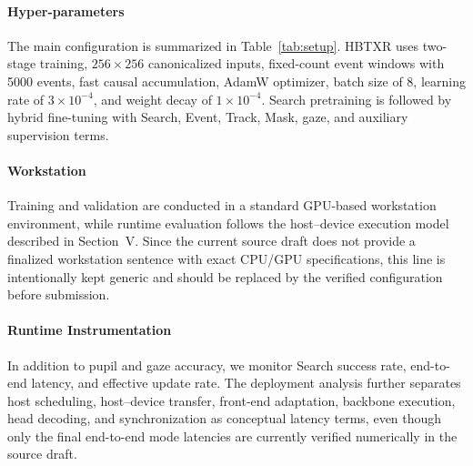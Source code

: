 \documentclass[journal]{IEEEtran}
\begin{document}
\paragraph*{Hyper-parameters}
The main configuration is summarized in Table~\ref{tab:setup}. HBTXR uses two-stage training, $256\times256$ canonicalized inputs, fixed-count event windows with 5000 events, fast causal accumulation, AdamW optimizer, batch size of 8, learning rate of $3\times10^{-4}$, and weight decay of $1\times10^{-4}$. Search pretraining is followed by hybrid fine-tuning with Search, Event, Track, Mask, gaze, and auxiliary supervision terms.

\paragraph*{Workstation}
Training and validation are conducted in a standard GPU-based workstation environment, while runtime evaluation follows the host--device execution model described in Section~V. Since the current source draft does not provide a finalized workstation sentence with exact CPU/GPU specifications, this line is intentionally kept generic and should be replaced by the verified configuration before submission.

\paragraph*{Runtime Instrumentation}
In addition to pupil and gaze accuracy, we monitor Search success rate, end-to-end latency, and effective update rate. The deployment analysis further separates host scheduling, host--device transfer, front-end adaptation, backbone execution, head decoding, and synchronization as conceptual latency terms, even though only the final end-to-end mode latencies are currently verified numerically in the source draft.
\end{document}
